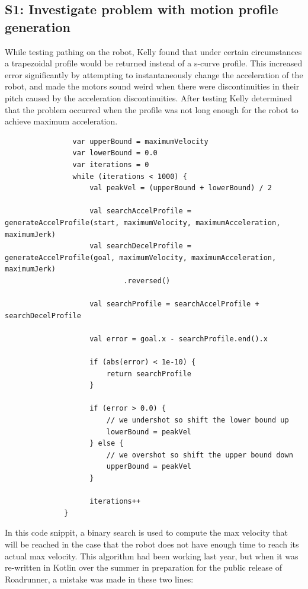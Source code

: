 \documentclass{article}
\begin{document}
\subsection{S1: Investigate problem with motion profile generation}

While testing pathing on the robot, Kelly found that under certain circumstances a trapezoidal profile would be returned instead of a s-curve profile. This increased error significantly by attempting to instantaneously change the acceleration of the robot, and made the motors sound weird when there were discontinuities in their pitch caused by the acceleration discontinuities. After testing Kelly determined that the problem occurred when the profile was not long enough for the robot to achieve maximum acceleration. 


\begin{lstlisting}
                var upperBound = maximumVelocity
                var lowerBound = 0.0
                var iterations = 0
                while (iterations < 1000) {
                    val peakVel = (upperBound + lowerBound) / 2

                    val searchAccelProfile = generateAccelProfile(start, maximumVelocity, maximumAcceleration, maximumJerk)
                    val searchDecelProfile = generateAccelProfile(goal, maximumVelocity, maximumAcceleration, maximumJerk)
                            .reversed()

                    val searchProfile = searchAccelProfile + searchDecelProfile

                    val error = goal.x - searchProfile.end().x

                    if (abs(error) < 1e-10) {
                        return searchProfile
                    }

                    if (error > 0.0) {
                        // we undershot so shift the lower bound up
                        lowerBound = peakVel
                    } else {
                        // we overshot so shift the upper bound down
                        upperBound = peakVel
                    }

                    iterations++
              }

\end{lstlisting}

In this code snippit, a binary search is used to compute the max velocity that will be reached in the case that the robot does not have enough time to reach its actual max velocity. This algorithm had been working last year, but when it was re-written in Kotlin over the summer in preparation for the public release of Roadrunner, a mistake was made in these two lines:
\end{document}
